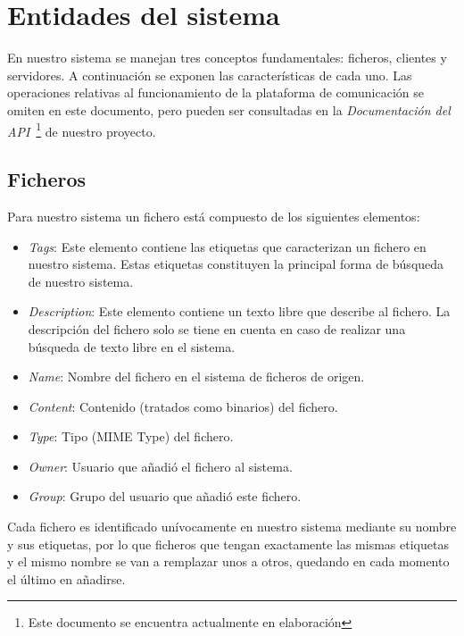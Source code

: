 \documentclass{article}
\begin{document}
\section{Entidades del sistema}

En nuestro sistema se manejan tres conceptos fundamentales: ficheros, clientes
y servidores. A continuación se exponen las características de cada uno. Las
operaciones relativas al funcionamiento de la plataforma de comunicación se
omiten en este documento, pero pueden ser consultadas en la
\emph{Documentación del API}~\footnote{Este documento se encuentra actualmente 
en elaboración} de nuestro proyecto.

\subsection{Ficheros}

Para nuestro sistema un fichero está compuesto de los siguientes elementos:

\begin{itemize}
  \item \emph{Tags}: Este elemento contiene las etiquetas que caracterizan un
  fichero en nuestro sistema. Estas etiquetas constituyen la principal forma de
  búsqueda de nuestro sistema.
  
  \item \emph{Description}: Este elemento contiene un texto libre que describe
  al fichero. La descripción del fichero solo se tiene en cuenta en caso de 
  realizar una búsqueda de texto libre en el sistema.
  
  \item \emph{Name}: Nombre del fichero en el sistema de ficheros de origen.
  
  \item \emph{Content}: Contenido (tratados como binarios) del fichero.
  
  \item \emph{Type}: Tipo (MIME Type) del fichero.
  
  \item \emph{Owner}: Usuario que añadió el fichero al sistema.
  
  \item \emph{Group}: Grupo del usuario que añadió este fichero.
\end{itemize} 

Cada fichero es identificado unívocamente en nuestro sistema mediante su nombre
y sus etiquetas, por lo que ficheros que tengan exactamente las mismas
etiquetas y el mismo nombre se van a remplazar unos a otros, quedando en cada
momento el último en añadirse. 
\end{document}
